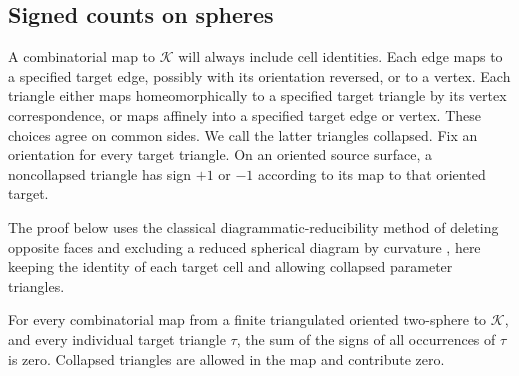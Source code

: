 \subsection{Signed counts on spheres}

A combinatorial map to $\mathcal K$ will always include cell identities.
Each edge maps to a specified target edge, possibly with its
orientation reversed, or to a vertex.  Each triangle either maps
homeomorphically to a specified target triangle by its vertex
correspondence, or maps affinely into a specified target edge or
vertex.  These choices agree on common sides.  We call the latter
triangles collapsed.  Fix an orientation for every target triangle.
On an oriented source surface, a noncollapsed triangle has sign
$+1$ or $-1$ according to its map to that oriented target.

The proof below uses the classical diagrammatic-reducibility method of
deleting opposite faces and excluding a reduced spherical diagram by
curvature \cite[Definition~3.1 and Corollary~4.6]{Gersten1987}, here
keeping the identity of each target cell and allowing collapsed parameter
triangles.

\begin{proposition}\label{prop:sphere-counts}
For every combinatorial map from a finite triangulated oriented
two-sphere to $\mathcal K$, and every individual target triangle
$\tau$, the sum of the signs of all occurrences of $\tau$ is zero.
Collapsed triangles are allowed in the map and contribute zero.
\end{proposition}

